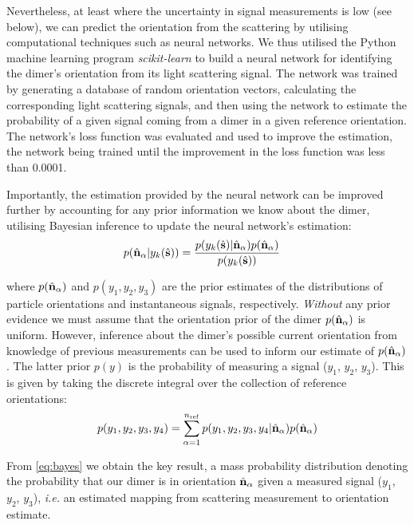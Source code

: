 Nevertheless, at least where the uncertainty in signal measurements is low (see 
below), we can predict the orientation from the scattering by utilising 
computational techniques such as neural networks. We thus utilised the Python 
machine learning program \textit{scikit-learn} \cite{Pedregosa2011} to build a 
neural network for identifying the dimer's orientation from its light scattering 
signal. The network was trained by generating a database of random orientation 
vectors, calculating the corresponding light scattering signals, and then using 
the network to estimate the probability of a given signal coming from a dimer in 
a given reference orientation. The network's loss function was evaluated and used 
to improve the estimation, the network being trained until the improvement in the 
loss function was less than 0.0001. 

Importantly, the estimation provided by the neural network can be improved further 
by accounting for any prior information we know about the dimer, utilising Bayesian 
inference to update the neural network's estimation: 
\begin{align}
	\label{eq:bayes}
	p(\hat{\bf n}_\alpha| y_k(\hat{\bf s}))
	&=
	\frac{p(y_k(\hat{\bf s})|\hat{\bf n}_\alpha)
		p(\hat{\bf n}_\alpha)}{p(y_k(\hat{\bf s}))}
\end{align}

where $p(\hat{\bf n}_\alpha)$ and $p(y_1, y_2, y_3)$ are the prior estimates of 
the distributions of particle orientations and instantaneous signals, respectively.
\textit{Without} any prior evidence we must assume that the orientation prior of 
the dimer $p(\hat{\bf n}_{\alpha})$ is uniform. However, inference about the 
dimer's possible current orientation from knowledge of previous measurements can 
be used to inform our estimate of $p(\hat{\bf n}_{\alpha})$. The latter prior 
$p(y)$ is the probability of measuring a signal ($y_1$, $y_2$, $y_3$). This is 
given by taking the discrete integral over the collection of reference orientations:
\begin{align}
	p(y_1, y_2, y_3, y_4)
	=
	\sum_{\alpha=1}^{n_{\rm ref}}
	p(y_1, y_2, y_3, y_4|\hat{\bf n}_\alpha)
	p(\hat{\bf n}_\alpha)
\end{align}

From \eqref{eq:bayes} we obtain the key result, a mass probability distribution 
denoting the probability that our dimer is in orientation $\hat{\bf n}_{\alpha}$ 
given a measured signal ($y_1$, $y_2$, $y_3$), \textit{i.e.} an estimated mapping 
from scattering measurement to orientation estimate. 

